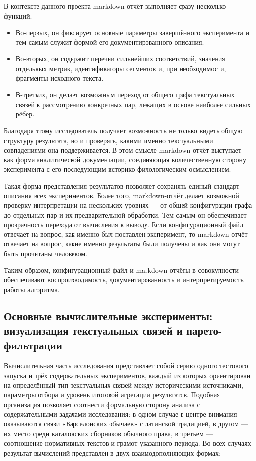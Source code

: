 В контексте данного проекта markdown-отчёт выполняет сразу несколько функций.

\begin{itemize}
\item Во-первых, он фиксирует основные параметры завершённого эксперимента и тем самым служит формой его документированного описания.
\item Во-вторых, он содержит перечни сильнейших соответствий, значения отдельных метрик, идентификаторы сегментов и, при необходимости, фрагменты исходного текста.
\item В-третьих, он делает возможным переход от общего графа текстуальных связей к рассмотрению конкретных пар, лежащих в основе наиболее сильных рёбер.
\end{itemize}
Благодаря этому исследователь получает возможность не только видеть общую структуру результата, но и проверять, какими именно текстуальными совпадениями она поддерживается. В этом смысле markdown-отчёт выступает как форма аналитической документации, соединяющая количественную сторону эксперимента с его последующим историко-филологическим осмыслением.

Такая форма представления результатов позволяет сохранять единый стандарт описания всех экспериментов. Более того, markdown-отчёт делает возможной проверку интерпретации на нескольких уровнях --- от общей конфигурации графа до отдельных пар и их предварительной обработки. Тем самым он обеспечивает прозрачность перехода от вычисления к выводу. Если конфигурационный файл отвечает на вопрос, как именно был поставлен эксперимент, то markdown-отчёт отвечает на вопрос, какие именно результаты были получены и как они могут быть прочитаны человеком.

Таким образом, конфигурационный файл и markdown-отчёты в совокупности обеспечивают воспроизводимость, документированность и интерпретируемость работы алгоритма.

\subsection{Основные вычислительные эксперименты: визуализация текстуальных связей и парето-фильтрации}

Вычислительная часть исследования представляет собой серию одного тестового запуска и трёх содержательных экспериментов, каждый из которых ориентирован на определённый тип текстуальных связей между историческими источниками, параметры отбора и уровень итоговой агрегации результатов. Подобная организация позволяет соотнести формальную сторону анализа с содержательными задачами исследования: в одном случае в центре внимания оказываются связи «Барселонских обычаев» с латинской традицией, в другом --- их место среди каталонских сборников обычного права, в третьем --- соотношение нормативных текстов и грамот указанного периода. Во всех случаях результат вычислений представлен в двух взаимодополняющих формах:


